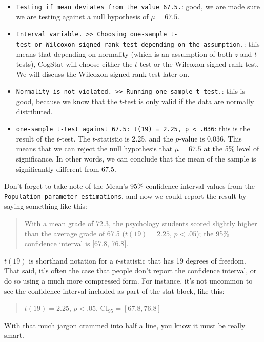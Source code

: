 \documentclass[
  11pt,
  a4paper,
  twoside,symmetric,openright]{book}
\providecommand{\tightlist}{%
  \setlength{\itemsep}{0pt}\setlength{\parskip}{0pt}}
\theoremstyle{break}
\theoremstyle{break}
\begin{document}
\begin{itemize}
\tightlist
\item
  \texttt{Testing\ if\ mean\ deviates\ from\ the\ value\ 67.5.}: good, we are made sure we are testing against a null hypothesis of \(\mu = 67.5\).
\item
  \texttt{Interval\ variable.\ \textgreater{}\textgreater{}\ Choosing\ one-sample\ t-test\ or\ Wilcoxon\ signed-rank\ test\ depending\ on\ the\ assumption.}: this means that depending on normality (which is an assumption of both \(z\) and \(t\)-tests), CogStat will choose either the \(t\)-test or the Wilcoxon signed-rank test. We will discuss the Wilcoxon signed-rank test later on.
\item
  \texttt{Normality\ is\ not\ violated.\ \textgreater{}\textgreater{}\ Running\ one-sample\ t-test.}: this is good, because we know that the \(t\)-test is only valid if the data are normally distributed.
\item
  \texttt{one-sample\ t-test\ against\ 67.5:\ t(19)\ =\ 2.25,\ p\ \textless{}\ .036}: this is the result of the \(t\)-test. The \(t\)-statistic is 2.25, and the \(p\)-value is 0.036. This means that we can reject the null hypothesis that \(\mu = 67.5\) at the 5\% level of significance. In other words, we can conclude that the mean of the sample is significantly different from 67.5.
\end{itemize}

Don't forget to take note of the Mean's 95\% confidence interval values from the \texttt{Population\ parameter\ estimations}, and now we could report the result by saying something like this:

\begin{quote}
With a mean grade of 72.3, the psychology students scored slightly higher than the average grade of 67.5 (\(t(19) = 2.25\), \(p<.05\)); the 95\% confidence interval is {[}67.8, 76.8{]}.
\end{quote}

\(t(19)\) is shorthand notation for a \(t\)-statistic that has 19 degrees of freedom. That said, it's often the case that people don't report the confidence interval, or do so using a much more compressed form. For instance, it's not uncommon to see the confidence interval included as part of the stat block, like this:

\begin{quote}
\(t(19) = 2.25\), \(p<.05\), CI\(_{95} = [67.8, 76.8]\)
\end{quote}

With that much jargon crammed into half a line, you know it must be really smart.
\end{document}
